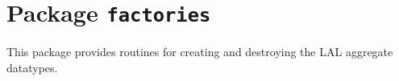 \chapter{Package \texttt{factories}}

This package provides routines for creating and destroying the LAL aggregate
datatypes.

\newpage
\newpage
